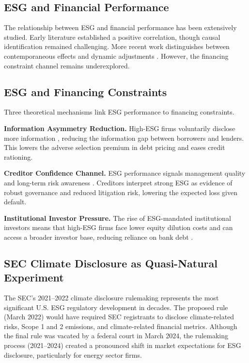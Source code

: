 \documentclass[11pt,a4paper]{article}
\begin{document}
\subsection{ESG and Financial Performance}

The relationship between ESG and financial performance has been extensively studied. Early literature \citep{Orlitzky2003,Friede2015} established a positive correlation, though causal identification remained challenging. More recent work distinguishes between contemporaneous effects and dynamic adjustments \citep{Eccles2014,Choi2023}. However, the financing constraint channel remains underexplored.

\subsection{ESG and Financing Constraints}

Three theoretical mechanisms link ESG performance to financing constraints.

\textbf{Information Asymmetry Reduction.} High-ESG firms voluntarily disclose more information \citep{Cheng2014}, reducing the information gap between borrowers and lenders. This lowers the adverse selection premium in debt pricing and eases credit rationing.

\textbf{Creditor Confidence Channel.} ESG performance signals management quality and long-term risk awareness \citep{Goss2011}. Creditors interpret strong ESG as evidence of robust governance and reduced litigation risk, lowering the expected loss given default.

\textbf{Institutional Investor Pressure.} The rise of ESG-mandated institutional investors means that high-ESG firms face lower equity dilution costs and can access a broader investor base, reducing reliance on bank debt \citep{Flammer2021}.

\subsection{SEC Climate Disclosure as Quasi-Natural Experiment}

The SEC's 2021--2022 climate disclosure rulemaking represents the most significant U.S. ESG regulatory development in decades. The proposed rule (March 2022) would have required SEC registrants to disclose climate-related risks, Scope 1 and 2 emissions, and climate-related financial metrics. Although the final rule was vacated by a federal court in March 2024, the rulemaking process (2021--2024) created a pronounced shift in market expectations for ESG disclosure, particularly for energy sector firms.
\end{document}
